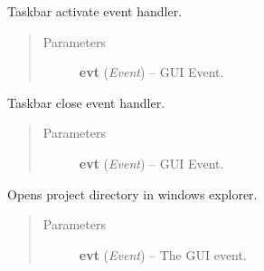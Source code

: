 \documentclass[letterpaper,10pt,english]{sphinxmanual}
\begin{document}
\begin{fulllineitems}
\begin{fulllineitems}
\end{fulllineitems}


\begin{fulllineitems}
\label{wos:wos.GUI.OnTaskBarActivate}
Taskbar activate event handler.
\begin{quote}\begin{description}
\item[{Parameters}] \leavevmode
\textbf{evt} (\emph{Event}) -- GUI Event.

\end{description}\end{quote}

\end{fulllineitems}


\begin{fulllineitems}
\label{wos:wos.GUI.OnTaskBarClose}
Taskbar close event handler.
\begin{quote}\begin{description}
\item[{Parameters}] \leavevmode
\textbf{evt} (\emph{Event}) -- GUI Event.

\end{description}\end{quote}

\end{fulllineitems}


\begin{fulllineitems}
\label{wos:wos.GUI.OpenProjectDir}
Opens project directory in windows explorer.
\begin{quote}\begin{description}
\item[{Parameters}] \leavevmode
\textbf{evt} (\emph{Event}) -- The GUI event.

\end{description}\end{quote}

\end{fulllineitems}



\end{fulllineitems}
\end{document}
